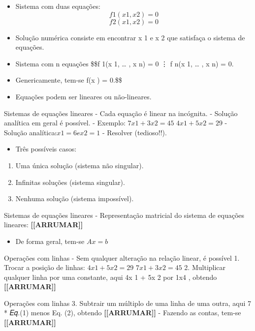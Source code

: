 \documentclass[
]{article}
\providecommand{\tightlist}{%
  \setlength{\itemsep}{0pt}\setlength{\parskip}{0pt}}
\begin{document}
\begin{itemize}
\item
  Sistema com duas equações: \[ f 1(x 1,x 2) = 0\] \[f 2(x 1,x 2) = 0\]
\item
  Solução numérica consiste em encontrar\hat{} x 1 e\hat{} x 2 que
  satisfaça o sistema de equações.
\item
  Sistema com n equações \$\$f 1(x 1, \ldots{} , x n) = 0 ⋮ f n(x 1,
  \ldots{} , x n) = 0.
\item
  Genericamente, tem-se f(x ) = 0.\$\$
\item
  Equações podem ser lineares ou não-lineares.
\end{itemize}

Sistemas de equações lineares - Cada equação é linear na incógnita. -
Solução analítica em geral é possível. - Exemplo: \(7x 1 + 3x 2 = 45\)
\(4x 1 + 5x 2 = 29\) - Solução
analítica:\(\hat{} x 1 = 6 e\hat{} x 2 = 1\) - Resolver (tedioso!!).

\begin{itemize}
\tightlist
\item
  Três possíveis casos:
\end{itemize}

\begin{enumerate}
\def\labelenumi{\arabic{enumi}.}
\tightlist
\item
  Uma única solução (sistema não singular).
\item
  Infinitas soluções (sistema singular).
\item
  Nenhuma solução (sistema impossível).
\end{enumerate}

Sistemas de equações lineares - Representação matricial do sistema de
equações lineares: \textbf{{[}{[}ARRUMAR{]}{]}}

\begin{itemize}
\tightlist
\item
  De forma geral, tem-se \(Ax = b\)
\end{itemize}

Operações com linhas - Sem qualquer alteração na relação linear, é
possível 1. Trocar a posição de linhas: \(4x 1 + 5x 2 = 29\)
\(7x 1 + 3x 2 = 45\) 2. Multiplicar qualquer linha por uma constante,
aqui 4x 1 + 5x 2 por 1x4 , obtendo \textbf{{[}{[}ARRUMAR{]}{]}}

Operações com linhas 3. Subtrair um múltiplo de uma linha de uma outra,
aqui 7 * 𝐸𝑞.(1) menos Eq. (2), obtendo \textbf{{[}{[}ARRUMAR{]}{]}} -
Fazendo as contas, tem-se \textbf{{[}{[}ARRUMAR{]}{]}}
\end{document}
